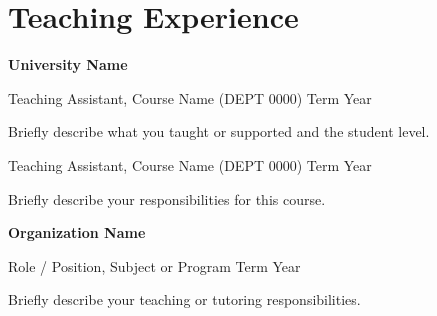 \section{Teaching Experience}

\begin{onecolentry}
    \textbf{University Name}
    \begin{highlights}
        \item Teaching Assistant, Course Name (DEPT 0000) \hfill Term Year
        \item[] Briefly describe what you taught or supported and the student level.
        \item Teaching Assistant, Course Name (DEPT 0000) \hfill Term Year
        \item[] Briefly describe your responsibilities for this course.
    \end{highlights}
\end{onecolentry}

\vspace{0.10cm}

\begin{onecolentry}
    \textbf{Organization Name}
    \begin{highlights}
        \item Role / Position, Subject or Program \hfill Term Year
        \item[] Briefly describe your teaching or tutoring responsibilities.
    \end{highlights}
\end{onecolentry}
